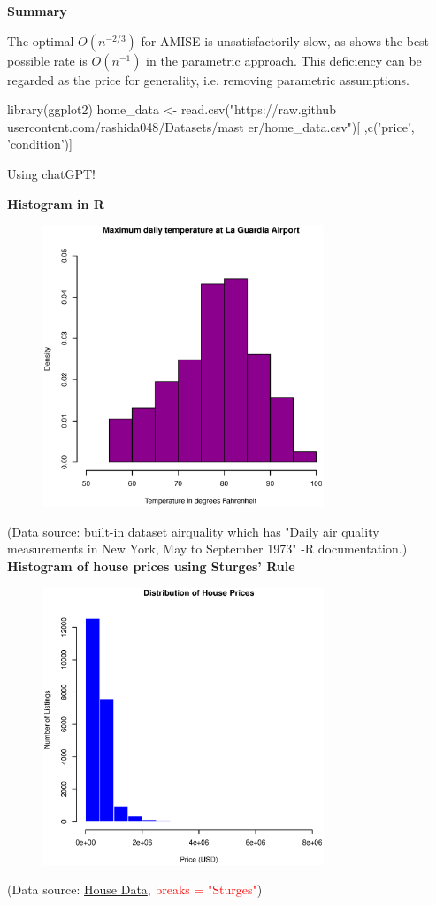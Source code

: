 \documentclass[19pt,landscaoe]{article}
\begin{document}
\newpage
{\LARGE\centerline{\textbf{Summary}}}
\vskip25pt
\begin{minipage}{.9\textwidth}
    \Large 
    The optimal $O(n^{-2/3})$ for AMISE is unsatisfactorily slow, as \cite{boydsteele78} shows the best possible rate is $O(n^{-1})$ in the parametric approach. This deficiency can be regarded as the price for generality, i.e. removing parametric assumptions.  

    \begin{Sinput}
        library(ggplot2)
        home_data <- read.csv("https://raw.github
        usercontent.com/rashida048/Datasets/mast
        er/home_data.csv")[ ,c('price', 'condition')]
    \end{Sinput}
    \vskip 10pt
    {\huge Using chatGPT!}
\end{minipage}


\newpage
{\LARGE{\textbf{Histogram in R}}}
\vskip25pt

\begin{figure}[h]
\centering
      \includegraphics[width=0.75\textwidth,height=0.52\textwidth]{temperature.eps}
    \label{figure5} 
\end{figure}
(Data source: built-in dataset airquality which has "Daily air quality measurements in New York, May to September 1973" -R documentation.)
\newpage
{\LARGE{\textbf{Histogram of house prices using Sturges' Rule}}}
\vskip25pt

\begin{figure}[h]
\centering
      \includegraphics[width=0.75\textwidth,height=0.52\textwidth]{hist_housing_default.eps}
    \label{figure6} 
\end{figure}
(Data source: \href{https://raw.githubusercontent.com/rashida048/Datasets/master/home_data.csv}{House Data}, \textcolor{red}{breaks = "Sturges"})
\end{document}
